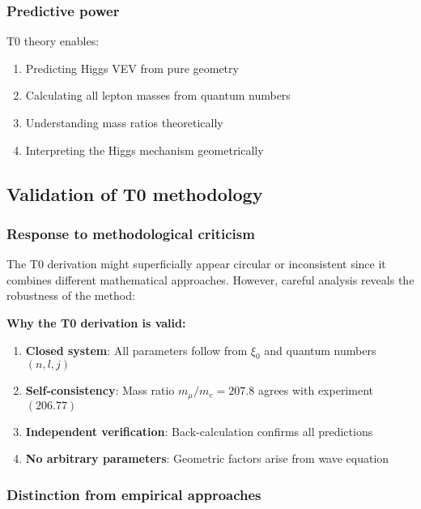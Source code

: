 \documentclass[12pt,a4paper]{article}
\begin{document}
\subsubsection{Predictive power}

T0 theory enables:

\begin{enumerate}
	\item Predicting Higgs VEV from pure geometry
	\item Calculating all lepton masses from quantum numbers
	\item Understanding mass ratios theoretically
	\item Interpreting the Higgs mechanism geometrically
\end{enumerate}

\subsection{Validation of T0 methodology}

\subsubsection{Response to methodological criticism}

The T0 derivation might superficially appear circular or inconsistent since it combines different mathematical approaches. However, careful analysis reveals the robustness of the method:

\begin{tcolorbox}[colback=blue!5!white,colframe=blue!75!black,title=Methodological Consistency]
	\textbf{Why the T0 derivation is valid:}
	
	\begin{enumerate}
		\item \textbf{Closed system}: All parameters follow from $\xi_0$ and quantum numbers $(n,l,j)$
		\item \textbf{Self-consistency}: Mass ratio $m_\mu/m_e = 207.8$ agrees with experiment $(206.77)$
		\item \textbf{Independent verification}: Back-calculation confirms all predictions
		\item \textbf{No arbitrary parameters}: Geometric factors arise from wave equation
	\end{enumerate}
\end{tcolorbox}

\subsubsection{Distinction from empirical approaches}
\end{document}

